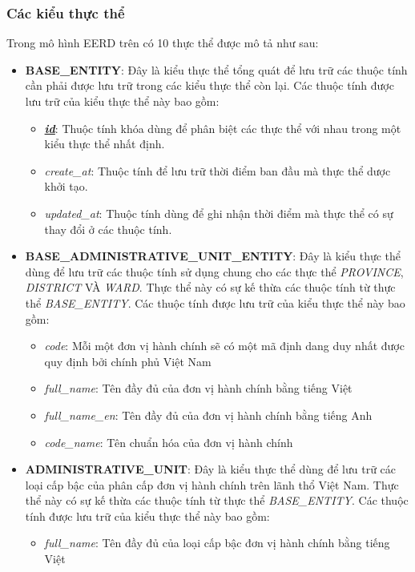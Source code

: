 \subsubsection{Các kiểu thực thể}
Trong mô hình EERD trên có 10 thực thể được mô tả như sau:
\begin{itemize}
    \item \textbf{BASE\_ENTITY}: Đây là kiểu thực thể tổng quát để lưu trữ các thuộc tính cần phải được lưu trữ trong các kiểu thực thể còn lại. Các thuộc tính được lưu trữ của kiểu thực thể này bao gồm:
    \begin{itemize}
        \item \underline{\textit{\bf id}}: Thuộc tính khóa dùng để phân biệt các thực thể với nhau trong một kiểu thực thể nhất định.
        \item \textit{create\_at}: Thuộc tính để lưu trữ thời điểm ban đầu mà thực thể dược khởi tạo.
        \item \textit{updated\_at}: Thuộc tính dùng để ghi nhận thời điểm mà thực thể có sự thay đổi ở các thuộc tính.
    \end{itemize}
    \item \textbf{BASE\_ADMINISTRATIVE\_UNIT\_ENTITY}: Đây là kiểu thực thể dùng để lưu trữ các thuộc tính sử dụng chung cho các thực thể \textit{PROVINCE}, \textit{DISTRICT} VÀ \textit{WARD}. Thực thể này có sự kế thừa các thuộc tính từ thực thể \textit{BASE\_ENTITY}. Các thuộc tính được lưu trữ của kiểu thực thể này bao gồm:
    \begin{itemize}
        \item \textit{code}: Mỗi một đơn vị hành chính sẽ có một mã định dang duy nhất được quy định bởi chính phủ Việt Nam
        \item \textit{full\_name}: Tên đầy đủ của đơn vị hành chính bằng tiếng Việt
        \item \textit{full\_name\_en}: Tên đầy đủ của đơn vị hành chính bằng tiếng Anh
        \item \textit{code\_name}: Tên chuẩn hóa của đơn vị hành chính
    \end{itemize}
    \item \textbf{ADMINISTRATIVE\_UNIT}: Đây là kiểu thực thể dùng để lưu trữ các loại cấp bậc của phân cấp đơn vị hành chính trên lãnh thổ Việt Nam. Thực thể này có sự kế thừa các thuộc tính từ thực thể \textit{BASE\_ENTITY}. Các thuộc tính được lưu trữ của kiểu thực thể này bao gồm:
    \begin{itemize}
        \item \textit{full\_name}: Tên đầy đủ của loại cấp bậc đơn vị hành chính bằng tiếng Việt

\end{itemize}
\end{itemize}
